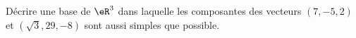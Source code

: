\begin{exercice}\label{exoLineraire0023}

	Décrire une base de $\eR^3$ dans laquelle les composantes des vecteurs $(7,-5,2)$ et $(\sqrt{3},29,-8)$ sont aussi simples que possible.

\end{exercice}
